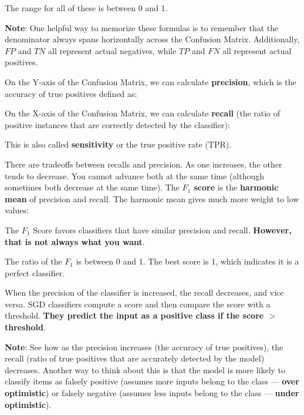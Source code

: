 {


The range for all of these is between 0 and 1.

\vs
\begin{aside}
    \textbf{Note}: One helpful way to memorize these formulas is to remember that the denominator always spans horizontally across the Confusion Matrix. Additionally, $FP$ and $TN$ all represent actual negatives, while $TP$ and $FN$ all represent actual positives.
\end{aside}
\vs

On the Y-axis of the Confusion Matrix, we can calculate \textbf{precision}, which is the accuracy of true positives defined as:


On the X-axis of the Confusion Matrix, we can calculate \textbf{recall} (the ratio of positive instances that are correctly detected by the classifier):


This is also called \textbf{sensitivity} or the true positive rate (TPR).
\vs

There are tradeoffs between recalls and precision. As one increases, the other tends to decrease. You cannot advance both at the same time (although sometimes both decrease at the same time). The \textbf{$F_1$ score} is the \textbf{harmonic mean} of precision and recall. The harmonic mean gives much more weight to low values:


The $F_1$ Score favors classifiers that have similar precision and recall. \textbf{However, that is not always what you want}.

The ratio of the $F_1$ is between 0 and 1. The best score is 1, which indicates it is a perfect classifier.


When the precision of the classifier is increased, the recall decreases, and vice versa. SGD classifiers compute a score and then compare the score with a threshold. \textbf{They predict the input as a positive class if the score $>$ threshold}.


\vs
\begin{aside}
    \textbf{Note}: See how as the precision increases (the accuracy of true positives), the recall (ratio of true positives that are accurately detected by the model) decreases. Another way to think about this is that the model is more likely to classify items as falsely positive (assumes more inputs belong to the class --- \textbf{over optimistic}) or falsely negative (assumes less inputs belong to the class --- \textbf{under optimistic}).
\end{aside}
\vs

}
